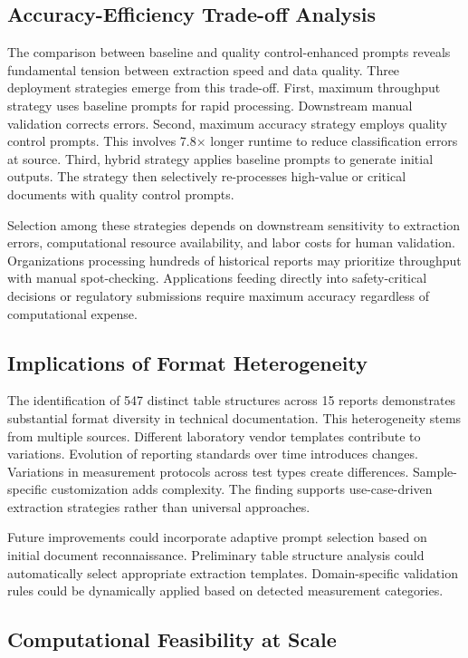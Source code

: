 \documentclass{svproc}
\begin{document}
\subsection{Accuracy-Efficiency Trade-off Analysis}

The comparison between baseline and quality control-enhanced prompts reveals fundamental tension between extraction speed and data quality. Three deployment strategies emerge from this trade-off. First, maximum throughput strategy uses baseline prompts for rapid processing. Downstream manual validation corrects errors. Second, maximum accuracy strategy employs quality control prompts. This involves 7.8× longer runtime to reduce classification errors at source. Third, hybrid strategy applies baseline prompts to generate initial outputs. The strategy then selectively re-processes high-value or critical documents with quality control prompts.

Selection among these strategies depends on downstream sensitivity to extraction errors, computational resource availability, and labor costs for human validation. Organizations processing hundreds of historical reports may prioritize throughput with manual spot-checking. Applications feeding directly into safety-critical decisions or regulatory submissions require maximum accuracy regardless of computational expense.

\subsection{Implications of Format Heterogeneity}

The identification of 547 distinct table structures across 15 reports demonstrates substantial format diversity in technical documentation. This heterogeneity stems from multiple sources. Different laboratory vendor templates contribute to variations. Evolution of reporting standards over time introduces changes. Variations in measurement protocols across test types create differences. Sample-specific customization adds complexity. The finding supports use-case-driven extraction strategies rather than universal approaches.

Future improvements could incorporate adaptive prompt selection based on initial document reconnaissance. Preliminary table structure analysis could automatically select appropriate extraction templates. Domain-specific validation rules could be dynamically applied based on detected measurement categories.

\subsection{Computational Feasibility at Scale}
\end{document}
